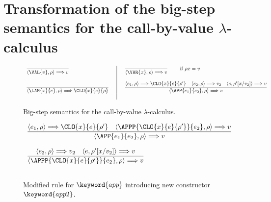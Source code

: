 \section{Transformation of the big-step semantics for the call-by-value $\lambda$-calculus}\label{lambda-ex}

\begin{figure}
\[
\begin{array}{l|l}
 \dfrac{ } 
{\langle \VAL{v}, \rho \rangle \Longrightarrow v}


&~~~
 \dfrac{ } 
{\langle \VAR{x}, \rho \rangle \Longrightarrow v}

 ~~~~~~~\text{if }  \rho x = v\\
 \\
\dfrac{ } 
{\langle \LAM{x}{e}, \rho \rangle \Longrightarrow \CLO{x}{e}{\rho}}~~~
&~~~
\dfrac{\langle e_1, \rho \rangle \Longrightarrow \CLO{x}{e}{\rho'} ~~~\langle e_2, \rho \rangle \Longrightarrow v_2~~~
\langle e, \rho'[x/v_2] \rangle \Longrightarrow v} 
{\langle \APP{e_1}{e_2}, \rho \rangle \Longrightarrow v}
 \\
 \\
 \end{array}
\]
\caption{Big-step semantics for the call-by-value $\lambda$-calculus.}\label{big-step-trans-lambda}
\end{figure}


\begin{figure}
\[
\begin{array}{l}

\dfrac{\langle e_1, \rho \rangle \Longrightarrow \CLO{x}{e}{\rho'} ~~~\langle \APPP {\CLO{x}{e}{\rho'}}{e_2}, \rho \rangle \Longrightarrow v} 
{\langle \APP{e_1}{e_2}, \rho \rangle \Longrightarrow v}
\\
\\
\dfrac{\langle e_2, \rho \rangle \Longrightarrow v_2~~~
\langle e, \rho'[x/v_2] \rangle \Longrightarrow v} 
{\langle \APPP{ \CLO{x}{e}{\rho'}}{e_2}, \rho \rangle \Longrightarrow v}
 \\
 \\
 \end{array}
\]
\caption{Modified rule for $\keyword{app}$ introducing new constructor $\keyword{app2}$.}\label{app2-trans}
\end{figure}

